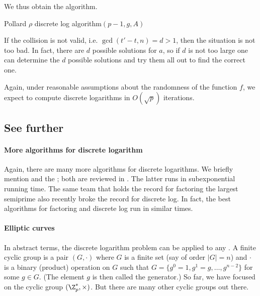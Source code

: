 \documentclass[a4paper, 11pt, openany]{book}
\begin{document}
We thus obtain the algorithm.

\begin{algorithm}[H]
\caption{Pollard $\rho$ discrete log algorithm$(p-1,g,A)$}
\begin{algorithmic}[1]
    \EndWhile
    \Else{}
    \EndIf
\end{algorithmic}
\end{algorithm}

If the collision is not valid, i.e. $\gcd(t' - t, n) = d > 1$, then the situation is not too bad. In fact, there are $d$ possible solutions for $a$, so if $d$ is not too large one can determine the $d$ possible solutions and try them all out to find the correct one.

Again, under reasonable assumptions about the randomness of the function $f$, we expect to compute discrete logarithms in $O(\sqrt{p})$ iterations.

\subsection{See further}

\paragraph{More algorithms for discrete logarithm}
Again, there are many more algorithms for discrete logarithms. We briefly mention  and the ; both are reviewed in \cite{Sti02}. The latter runs in subexponential running time. The same team that holds the record for factoring the largest semiprime also recently broke the record for discrete log. In fact, the best algorithms for factoring and discrete log run in similar times.

\paragraph{Elliptic curves}
In abstract terms, the discrete logarithm problem can be applied to any . A finite cyclic group is a pair $(G,\cdot)$ where $G$ is a finite set (say of order $|G| = n$) and $\cdot$ is a binary (product) operation on $G$ such that $G = \{g^0 = 1, g^1 = g, \dots, g^{n-2} \}$ for some $g \in G$. (The element $g$ is then called the generator.) So far, we have focused on the cyclic group $(\Z_p^*, \times)$. But there are many other cyclic groups out there.
\end{document}

